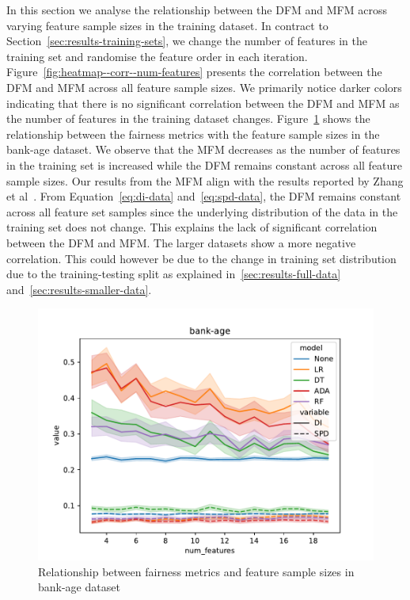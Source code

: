 \documentclass{article}
\begin{document}
In this section we analyse the relationship between the DFM and MFM
across varying feature sample sizes in the training dataset. In
contract to Section \ref{sec:results-training-sets}, we change the
number of features in the training set and randomise the feature order
in each iteration. Figure \ref{fig:heatmap--corr--num-features}
presents the correlation between the DFM and MFM across all feature
sample sizes. We primarily notice darker colors indicating that there
is no significant correlation between the DFM and MFM as the number of
features in the training dataset changes.
Figure \ref{fig:lineplot--num-features--di-spd--bank-age} shows the
relationship between the fairness metrics with the feature sample
sizes in the bank-age dataset. We observe that the MFM decreases as the
number of features in the training set is increased while the DFM
remains constant across all feature sample sizes. Our results from the
MFM align with the results reported by Zhang et
al \cite{zhang2021ignorance}. From Equation \ref{eq:di-data}
and \ref{eq:spd-data}, the DFM remains constant across all feature set
samples since the underlying distribution of the data in the training
set does not change. This explains the lack of significant correlation
between the DFM and MFM. The larger datasets show a more negative
correlation. This could however be due to the change in training set
distribution due to the training-testing split as explained
in \ref{sec:results-full-data} and \ref{sec:results-smaller-data}.

\begin{figure}
  \centering
  \includegraphics[width=0.95\linewidth]{lineplot--num-features--di-spd--bank-age.pdf}
  \caption{Relationship between fairness metrics and feature sample
    sizes in bank-age dataset}
  \label{fig:lineplot--num-features--di-spd--bank-age}
\end{figure}
\end{document}
